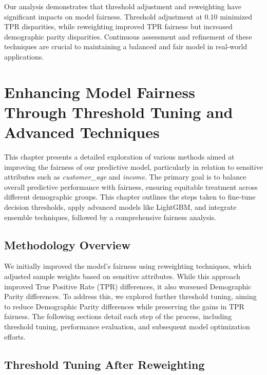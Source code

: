 \documentclass[12pt,a4paper]{report}
\begin{document}
Our analysis demonstrates that threshold adjustment and reweighting have significant impacts on model fairness. Threshold adjustment at 0.10 minimized TPR disparities, while reweighting improved TPR fairness but increased demographic parity disparities. Continuous assessment and refinement of these techniques are crucial to maintaining a balanced and fair model in real-world applications.\\






\chapter{Enhancing Model Fairness Through Threshold Tuning and Advanced Techniques}



This chapter presents a detailed exploration of various methods aimed at improving the fairness of our predictive model, particularly in relation to sensitive attributes such as \textit{customer\_age} and \textit{income}. The primary goal is to balance overall predictive performance with fairness, ensuring equitable treatment across different demographic groups. This chapter outlines the steps taken to fine-tune decision thresholds, apply advanced models like LightGBM, and integrate ensemble techniques, followed by a comprehensive fairness analysis.\\

\section{Methodology Overview}

We initially improved the model's fairness using reweighting techniques, which adjusted sample weights based on sensitive attributes. While this approach improved True Positive Rate (TPR) differences, it also worsened Demographic Parity differences. To address this, we explored further threshold tuning, aiming to reduce Demographic Parity differences while preserving the gains in TPR fairness. The following sections detail each step of the process, including threshold tuning, performance evaluation, and subsequent model optimization efforts.\\

\section{Threshold Tuning After Reweighting}
\end{document}
